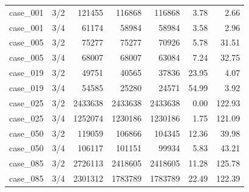\begin{tabular}{llrrrrr}
case\_001 & 3/2 & 121455 & 116868 & 116868 & 3.78 & 2.66 \\
case\_001 & 3/4 & 61174 & 58984 & 58984 & 3.58 & 2.96 \\
case\_005 & 3/2 & 75277 & 75277 & 70926 & 5.78 & 31.51 \\
case\_005 & 3/4 & 68007 & 68007 & 63084 & 7.24 & 32.75 \\
case\_019 & 3/2 & 49751 & 40565 & 37836 & 23.95 & 4.07 \\
case\_019 & 3/4 & 54585 & 25280 & 24571 & 54.99 & 3.92 \\
case\_025 & 3/2 & 2433638 & 2433638 & 2433638 & 0.00 & 122.93 \\
case\_025 & 3/4 & 1252074 & 1230186 & 1230186 & 1.75 & 121.09 \\
case\_050 & 3/2 & 119059 & 106866 & 104345 & 12.36 & 39.98 \\
case\_050 & 3/4 & 106117 & 101151 & 99934 & 5.83 & 43.21 \\
case\_085 & 3/2 & 2726113 & 2418605 & 2418605 & 11.28 & 125.78 \\
case\_085 & 3/4 & 2301312 & 1783789 & 1783789 & 22.49 & 122.39 \\
\bottomrule
\end{tabular}
